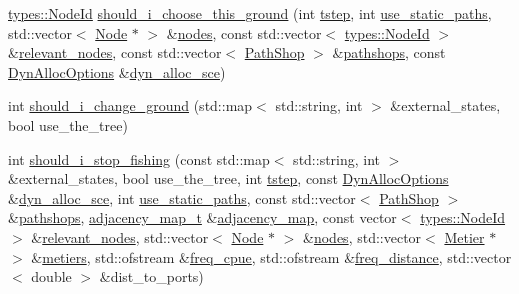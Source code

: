 \begin{DoxyCompactItemize}
\item 
\mbox{\hyperlink{classtypes_1_1_node_id}{types\+::\+Node\+Id}} \mbox{\hyperlink{class_vessel_a62002449aeeeb51233c6797aacbbcc83}{should\+\_\+i\+\_\+choose\+\_\+this\+\_\+ground}} (int \mbox{\hyperlink{thread__vessels_8cpp_a84bc73d278de929ec9974e1a95d9b23a}{tstep}}, int \mbox{\hyperlink{thread__vessels_8cpp_a47c8128a8da7af20c2aab95990bcb2dc}{use\+\_\+static\+\_\+paths}}, std\+::vector$<$ \mbox{\hyperlink{class_node}{Node}} $\ast$ $>$ \&\mbox{\hyperlink{thread__vessels_8cpp_ace5675146c8515428d094fd142d8a2d2}{nodes}}, const std\+::vector$<$ \mbox{\hyperlink{classtypes_1_1_node_id}{types\+::\+Node\+Id}} $>$ \&\mbox{\hyperlink{thread__vessels_8cpp_a805aea562dce0ee8a65d4cdb26f3f1ae}{relevant\+\_\+nodes}}, const std\+::vector$<$ \mbox{\hyperlink{class_path_shop}{Path\+Shop}} $>$ \&\mbox{\hyperlink{thread__vessels_8cpp_a1d6e93fdf06dc624480583be2cdd0748}{pathshops}}, const \mbox{\hyperlink{class_dyn_alloc_options}{Dyn\+Alloc\+Options}} \&\mbox{\hyperlink{thread__vessels_8cpp_a8389f6b9261a2039cabeecc230207043}{dyn\+\_\+alloc\+\_\+sce}})
\item 
int \mbox{\hyperlink{class_vessel_a713b45c6df81e3a355ca1dfc7c48a65d}{should\+\_\+i\+\_\+change\+\_\+ground}} (std\+::map$<$ std\+::string, int $>$ \&external\+\_\+states, bool use\+\_\+the\+\_\+tree)
\item 
int \mbox{\hyperlink{class_vessel_af09b8bb3dd4665fdcf738e5ffac3622e}{should\+\_\+i\+\_\+stop\+\_\+fishing}} (const std\+::map$<$ std\+::string, int $>$ \&external\+\_\+states, bool use\+\_\+the\+\_\+tree, int \mbox{\hyperlink{thread__vessels_8cpp_a84bc73d278de929ec9974e1a95d9b23a}{tstep}}, const \mbox{\hyperlink{class_dyn_alloc_options}{Dyn\+Alloc\+Options}} \&\mbox{\hyperlink{thread__vessels_8cpp_a8389f6b9261a2039cabeecc230207043}{dyn\+\_\+alloc\+\_\+sce}}, int \mbox{\hyperlink{thread__vessels_8cpp_a47c8128a8da7af20c2aab95990bcb2dc}{use\+\_\+static\+\_\+paths}}, const std\+::vector$<$ \mbox{\hyperlink{class_path_shop}{Path\+Shop}} $>$ \&\mbox{\hyperlink{thread__vessels_8cpp_a1d6e93fdf06dc624480583be2cdd0748}{pathshops}}, \mbox{\hyperlink{myutils_8h_ae689dbcb43e66abf9a513718b83bd87d}{adjacency\+\_\+map\+\_\+t}} \&\mbox{\hyperlink{thread__vessels_8cpp_ada1040d49789f59db85b5c6096b3313d}{adjacency\+\_\+map}}, const vector$<$ \mbox{\hyperlink{classtypes_1_1_node_id}{types\+::\+Node\+Id}} $>$ \&\mbox{\hyperlink{thread__vessels_8cpp_a805aea562dce0ee8a65d4cdb26f3f1ae}{relevant\+\_\+nodes}}, std\+::vector$<$ \mbox{\hyperlink{class_node}{Node}} $\ast$ $>$ \&\mbox{\hyperlink{thread__vessels_8cpp_ace5675146c8515428d094fd142d8a2d2}{nodes}}, std\+::vector$<$ \mbox{\hyperlink{class_metier}{Metier}} $\ast$ $>$ \&\mbox{\hyperlink{thread__vessels_8cpp_add976a96f7a0f5c20f5314d72234c427}{metiers}}, std\+::ofstream \&\mbox{\hyperlink{thread__vessels_8cpp_ad541b5d62baa9ad6aec2c8cbefaa3b9a}{freq\+\_\+cpue}}, std\+::ofstream \&\mbox{\hyperlink{thread__vessels_8cpp_a0eea96bfd17303c2c899a08bb2c9d35e}{freq\+\_\+distance}}, std\+::vector$<$ double $>$ \&dist\+\_\+to\+\_\+ports)

\end{DoxyCompactItemize}

